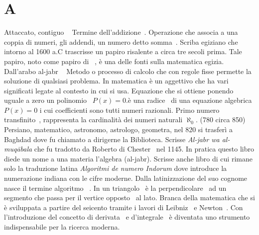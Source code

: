 \chapter{A}
\vspace{5mm}
Attaccato, contiguo \pointsto~
Termine dell'addizione\pointsto~.
Operazione che associa a una coppia di numeri, gli addendi, un numero detto somma\pointsto~.
 Scriba egiziano che intorno al 1600 a.C trascrisse un papiro risalente a circa tre secoli prima. Tale papiro, noto come papiro di \pointsto~, è una delle fonti sulla matematica egizia.
 Dall'arabo al-jabr \pointsto~ 
Metodo o processo di calcolo che con regole fisse permette la soluzione di qualsiasi problema.
In matematica è un aggettivo che ha vari significati legate al contesto in cui si usa.
 Equazione che si ottiene ponendo uguale a zero un polinomio\pointsto~ $P(x)=0$.è una radice\pointsto~ di una equazione algebrica $P(x)=0$ i cui coefficienti sono tutti numeri razionali.
Primo numero transfinito\pointsto~, rappresenta la cardinalità dei numeri naturali $\aleph_{0}$.
(780 circa 850) Persiano, matematico, astronomo, astrologo, geometra, nel 820 si trasferì a Baghdad dove fu chiamato a dirigerne la Biblioteca. Scrisse \textit{Al-jabr wa al-muqābala} che fu tradotto da Roberto di Chester\pointsto~ nel 1145. In pratica questo libro diede un nome a una materia l'algebra (al-jabr). Scrisse anche libro di cui rimane solo la traduzione latina \textit{Algoritmi de numero Indorum} dove introduce la numerazione indiana con le cifre moderne. Dalla latinizzazione del suo cognome nasce il termine algoritmo\pointsto~ \cite{Gheverghese2000}\cite{Kline1972}.
In un triangolo\pointsto~ è la perpendicolare\pointsto~ ad un segmento che passa per il vertice opposto\pointsto~ al lato.
Branca della matematica che si è sviluppata a partire del seicento tramite i lavori di Leibniz\pointsto~ e Newton\pointsto~. Con l'introduzione del concetto di derivata\pointsto~ e d'integrale\pointsto~ è diventata uno strumento indispensabile per la ricerca moderna. 
